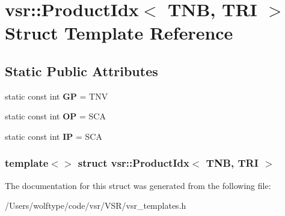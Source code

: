\hypertarget{structvsr_1_1_product_idx_3_01_t_n_b_00_01_t_r_i_01_4}{\section{vsr\-:\-:Product\-Idx$<$ T\-N\-B, T\-R\-I $>$ Struct Template Reference}
\label{structvsr_1_1_product_idx_3_01_t_n_b_00_01_t_r_i_01_4}
}
\subsection*{Static Public Attributes}
\begin{DoxyCompactItemize}
\item 
\hypertarget{structvsr_1_1_product_idx_3_01_t_n_b_00_01_t_r_i_01_4_a532c81734507063ff8b01669714e3c31}{static const int {\bfseries G\-P} = T\-N\-V}\label{structvsr_1_1_product_idx_3_01_t_n_b_00_01_t_r_i_01_4_a532c81734507063ff8b01669714e3c31}

\item 
\hypertarget{structvsr_1_1_product_idx_3_01_t_n_b_00_01_t_r_i_01_4_af90d9f2d700e1d144e912f4d26a4e198}{static const int {\bfseries O\-P} = S\-C\-A}\label{structvsr_1_1_product_idx_3_01_t_n_b_00_01_t_r_i_01_4_af90d9f2d700e1d144e912f4d26a4e198}

\item 
\hypertarget{structvsr_1_1_product_idx_3_01_t_n_b_00_01_t_r_i_01_4_ab17c919783fda52a1f622c3e72e27582}{static const int {\bfseries I\-P} = S\-C\-A}\label{structvsr_1_1_product_idx_3_01_t_n_b_00_01_t_r_i_01_4_ab17c919783fda52a1f622c3e72e27582}

\end{DoxyCompactItemize}
\subsubsection*{template$<$$>$ struct vsr\-::\-Product\-Idx$<$ T\-N\-B, T\-R\-I $>$}



The documentation for this struct was generated from the following file\-:\begin{DoxyCompactItemize}
\item 
/\-Users/wolftype/code/vsr/\-V\-S\-R/vsr\-\_\-templates.\-h\end{DoxyCompactItemize}
